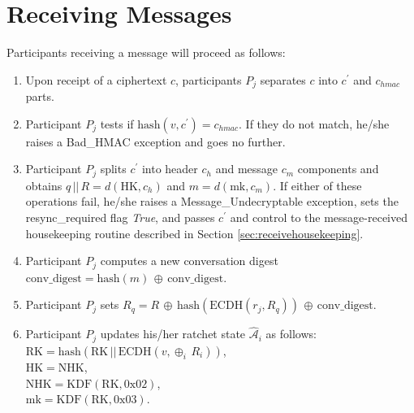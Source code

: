 \documentclass[%
preprint,
amsmath,amssymb,
aps,
prb,
floatfix,
]{revtex4-1}
\begin{document}
\section{\label{sec:receiving}Receiving Messages}
Participants receiving a message will proceed as follows:
\begin{enumerate}
\item Upon receipt of a ciphertext $c$, participants $P_j$ separates $c$ into
$c^\prime$ and $c_{hmac}$ parts.
\item Participant $P_j$ tests if $\mathrm{hash}(v, c^\prime) = c_{hmac}$. If
they do not match, he/she raises a Bad\_HMAC exception and goes no further.
\item Participant $P_j$ splits $c^\prime$ into header $c_h$ and message $c_m$ components
and obtains $q \, || \, R =
d(\mathrm{HK}, c_h)$ and $m = d(\mathrm{mk},
c_m)$. If either of these operations fail, he/she raises a Message\_Undecryptable
exception, sets the resync\_required flag \textit{True},
and passes $c^\prime$ and control to the message-received housekeeping routine described in
Section \ref{sec:receivehousekeeping}.
\item Participant $P_j$ computes a new conversation digest
$\mathrm{conv\_digest} = \mathrm{hash}(m) \, \oplus \, \mathrm{conv\_digest}$.
\item Participant $P_j$ sets $R_q = R \, \oplus \,
\mathrm{hash}(\mathrm{ECDH}(r_j, R_q)) \, \oplus \, \mathrm{conv\_digest}$.
\item Participant $P_j$ updates his/her ratchet state $\mathcal{\hat{A}}_i$ as
follows: \\
$\mathrm{RK} = \mathrm{hash}(\mathrm{RK} \, || \, \mathrm{ECDH}(v, \oplus_i
\, R_i))$, \\
$\mathrm{HK} = \mathrm{NHK}$, \\
$\mathrm{NHK} = \mathrm{KDF}(\mathrm{RK}, 0\mathrm{x}02)$, \\
$\mathrm{mk} = \mathrm{KDF}(\mathrm{RK}, 0\mathrm{x}03)$.

\end{enumerate}
\end{document}
